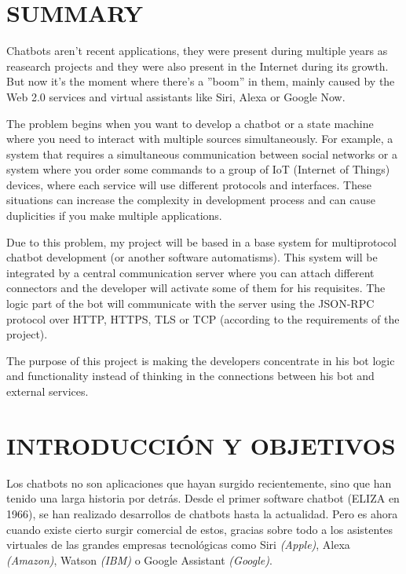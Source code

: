 \documentclass[spanish,12pt, a4paper, twoside]{paper}
\let\oldsection\section
\def\section{\cleardoublepage\oldsection}
\begin{document}
\section*{SUMMARY}
Chatbots aren't recent applications, they were present during multiple years as reasearch projects and they were also present in the Internet during its growth. But now it's the moment where there's a ''boom'' in them, mainly caused by the Web 2.0 services and virtual assistants like Siri, Alexa or Google Now.
\newline

The problem begins when you want to develop a chatbot or a state machine where you need to interact with multiple sources simultaneously. For example, a system that requires a simultaneous communication between social networks or a system where you order some commands to a group of IoT (Internet of Things) devices, where each service will use different protocols and interfaces. These situations can increase the complexity in development process and can cause duplicities if you make multiple applications. 
\newline

Due to this problem, my project will be based in a base system for multiprotocol chatbot development (or another software automatisms). This system will be integrated by a central communication server where you can attach different connectors and the developer will activate some of them for his requisites. The logic part of the bot will communicate with the server using the JSON-RPC protocol over HTTP, HTTPS, TLS or TCP (according to the requirements of the project).
\newline

The purpose of this project is making the developers concentrate in his bot logic and functionality instead of thinking in the connections between his bot and external services.

\tableofcontents %

\listoffigures

\newpage
{} 

\section{INTRODUCCIÓN Y OBJETIVOS}

Los chatbots no son aplicaciones que hayan surgido recientemente, sino que han tenido una larga historia por detrás. Desde el primer software chatbot (ELIZA en 1966), se han realizado desarrollos de chatbots hasta la actualidad. Pero es ahora cuando existe cierto surgir comercial de estos, gracias sobre todo a los asistentes virtuales de las grandes empresas tecnológicas como Siri \emph{(Apple)}, Alexa \emph{(Amazon)}, Watson \emph{(IBM)} o Google Assistant \emph{(Google)}.
\newline
\end{document}
